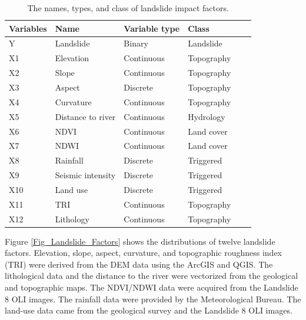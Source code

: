 \documentclass[a4paper,fleqn]{cas-sc}
\begin{document}
\begin{table}
  \centering
  \caption{The names, types, and class of landslide impact factors.} 
  \begin{tabular}{llllll}
    \toprule
    Variables & Name  & Variable type & Class \\
    \midrule
    Y     & Landslide  & Binary & Landslide \\
    X1    & Elevation  & Continuous & Topography \\
    X2    & Slope  & Continuous & Topography \\
    X3    & Aspect  & Discrete & Topography \\
    X4   & Curvature  & Continuous & Topography \\
    X5   & Distance to river  & Continuous  & Hydrology \\
    X6   & NDVI   & Continuous & Land cover  \\
    X7   & NDWI   & Continuous & Land cover \\
    X8   & Rainfall  & Discrete & Triggered  \\
    X9   & Seismic intensity  & Discrete & Triggered  \\
    X10   & Land use  & Discrete & Triggered  \\
    X11   & TRI  & Continuous & Topography  \\
    X12   & Lithology  & Continuous & Topography  \\
    \bottomrule
    \end{tabular}%
  \label{tab_factors}%
\end{table}%

Figure \ref{Fig_Landslide_Factors} shows the distributions of twelve landslide factors. 
Elevation, slope, aspect, curvature, and topographic roughness index (TRI) were derived from the DEM data using the ArcGIS and QGIS. 
The lithological data and the distance to the river were vectorized from the geological and topographic maps. 
The NDVI/NDWI data were acquired from the Landslide 8 OLI images. 
The rainfall data were provided by the Meteorological Bureau. 
The land-use data came from the geological survey and the Landslide 8 OLI images.
\end{document}
